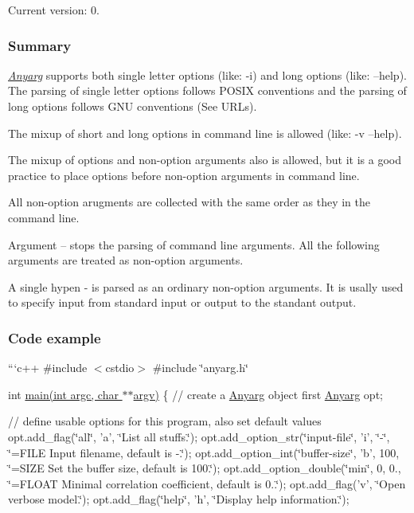 Current version\-: 0.

\subsubsection*{Summary}

{\itshape \hyperlink{class_anyarg}{Anyarg}} supports both single letter options (like\-: -\/i) and long options (like\-: --help). The parsing of single letter options follows P\-O\-S\-I\-X conventions and the parsing of long options follows G\-N\-U conventions (See U\-R\-Ls).

The mixup of short and long options in command line is allowed (like\-: -\/v --help).

The mixup of options and non-\/option arguments also is allowed, but it is a good practice to place options before non-\/option arguments in command line.

All non-\/option arugments are collected with the same order as they in the command line.

Argument -- stops the parsing of command line arguments. All the following arguments are treated as non-\/option arguments.

A single hypen -\/ is parsed as an ordinary non-\/option arguments. It is usally used to specify input from standard input or output to the standant output.

\subsubsection*{Code example}

```c++ \#include $<$cstdio$>$ \#include \char`\"{}anyarg.\-h\char`\"{}

int \hyperlink{example_8cpp_a3c04138a5bfe5d72780bb7e82a18e627}{main(int argc, char $\ast$$\ast$argv)} \{ // create a \hyperlink{class_anyarg}{Anyarg} object first \hyperlink{class_anyarg}{Anyarg} opt;

// define usable options for this program, also set default values opt.\-add\-\_\-flag(\char`\"{}all\char`\"{}, 'a', \char`\"{}\-List all stuffs.\char`\"{}); opt.\-add\-\_\-option\-\_\-str(\char`\"{}input-\/file\char`\"{}, 'i', \char`\"{}-\/\char`\"{}, \char`\"{}=\-F\-I\-L\-E Input filename, default is -\/.\char`\"{}); opt.\-add\-\_\-option\-\_\-int(\char`\"{}buffer-\/size\char`\"{}, 'b', 100, \char`\"{}=\-S\-I\-Z\-E Set the buffer size, default is 100.\char`\"{}); opt.\-add\-\_\-option\-\_\-double(\char`\"{}min\char`\"{}, 0, 0., \char`\"{}=\-F\-L\-O\-A\-T Minimal correlation coefficient, default is 0..\char`\"{}); opt.\-add\-\_\-flag('v', \char`\"{}\-Open verbose model.\char`\"{}); opt.\-add\-\_\-flag(\char`\"{}help\char`\"{}, 'h', \char`\"{}\-Display help information.\char`\"{});

